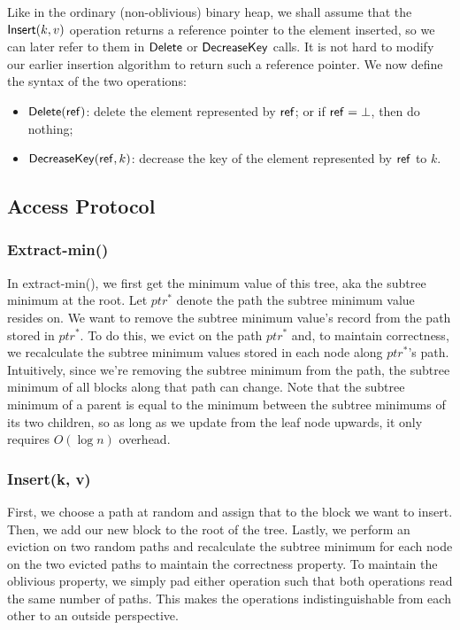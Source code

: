 \documentclass[11pt]{article}
\begin{document}
Like in the ordinary (non-oblivious) binary heap, we shall assume that 
the ${\sf Insert}(k, v)$
operation returns a reference pointer 
to the element inserted, so we can later refer to them
in ${\sf Delete}$ or ${\sf DecreaseKey}$ calls. 
It is not hard to modify our earlier insertion algorithm
to return such a reference pointer. 
We now define the syntax of the two operations: 
\begin{itemize}
    \item ${\sf Delete}({\sf ref})$: 
delete the element represented
by ${\sf ref}$; or if ${\sf ref} = \bot$, then do nothing;  
    \item ${\sf DecreaseKey}({\sf ref}, k)$: %
decrease the key of the element 
represented by ${\sf ref}$ to $k$. 
\end{itemize}



\subsection{Access Protocol}

\subsubsection{Extract-min()}
In extract-min(), we first get the minimum value of this tree, aka the subtree minimum at the root. Let $ptr^*$ denote the path the subtree minimum value resides on. We want to remove the subtree minimum value's record from the path stored in $ptr^*$. To do this, we evict on the path $ptr^*$ and, to maintain correctness, we recalculate the subtree minimum values stored in each node along $ptr^*$'s path. Intuitively, since we're removing the subtree minimum from the path, the subtree minimum of all blocks along that path can change. Note that the subtree minimum of a parent is equal to the minimum between the subtree minimums of its two children, so as long as we update from the leaf node upwards, it only requires $O(\log n)$ overhead.


\subsubsection{Insert(k, v)}
First, we choose a path at random and assign that to the block we want to insert. Then, we add our new block to the root of the tree. Lastly, we perform an eviction on two random paths and recalculate the subtree minimum for each node on the two evicted paths to maintain the correctness property. To maintain the oblivious property, we simply pad either operation such that both operations read the same number of paths. This makes the operations indistinguishable from each other to an outside perspective.
\end{document}
